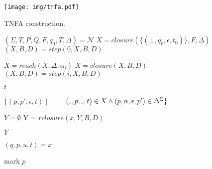 \documentclass[AMA,STIX1COL]{WileyNJD-v2}
\newcommand{\Xund}{\rule{.4em}{.4pt}}
\newcommand{\XN}{\mathcal{N}}
\begin{document}
\begin{figure}\label{fig_tnfa}
\texttt{[image: img/tnfa.pdf]}
\caption{
TNFA construction.
}
\end{figure}




\begin{figure*}
\begin{multicols}{2}

    \begin{algorithm}[H] \DontPrintSemicolon {} 
    \Fn {$\underline{match (\XN, \alpha_1 \dots \alpha_n)} \smallskip$} {
        $(\Sigma, T, P, Q, F, q_0, T, \Delta) = \XN$ \;
        $X = closure(\{ (\bot, q_0, \epsilon, t_0) \}, F, \Delta)$ \;
        $(X, B, D) = step(0, X, B, D)$ \;

        \BlankLine
         {
            $X = reach(X, \Delta, \alpha_i)$ \;
            $X = closure(X, B, D)$ \;
            $(X, B, D) = step(i, X, B, D)$ \;
        }

        \BlankLine
        \lIf {$\exists (\Xund, p, \Xund, t) \in X \mid p \in F$} {
            \Return $t$
        } \lElse {
            \Return $\bot$
        }
    }
    \end{algorithm}


    \begin{algorithm}[H] \DontPrintSemicolon {} 
     {
        \Return $\{ (p, p', \epsilon, t) \mid$ \;
        $\qquad (\Xund, p, \Xund, t) \in X \wedge
            (p, \alpha, \epsilon, p') \in \Delta^\Sigma \}$
    }
    \end{algorithm}


\iffalse
    \begin{algorithm}[H] \DontPrintSemicolon {} 
     {

        $Y = \emptyset$ \;
         {
            Y = $rclosure (x, Y, B, D)$
        }

        \Return $Y$ \;
    }
    \end{algorithm}


    \begin{algorithm}[H] \DontPrintSemicolon {} 
     {
        $(q, p, u, t) = x$ \;
         {
        mark $p$ \;

}}
\end{algorithm}
\end{multicols}
\end{figure*}
\end{document}
